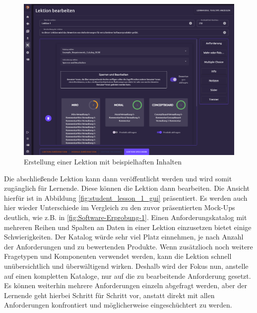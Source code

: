 \begin{figure}[H]
    \centering
    \includegraphics[width=1.0\textwidth]{assets/screenshots/finale_gui/Lektion_Erstellung_mit_Inhalt.png}
    \caption{Erstellung einer Lektion mit beispielhaften Inhalten}
    \label{fig:lesson_create_gui}
\end{figure}

Die abschließende Lektion kann dann veröffentlicht werden und wird somit zugänglich für Lernende. Diese können die Lektion dann bearbeiten. Die Ansicht hierfür ist in Abbildung \ref{fig:student_lesson_1_gui} präsentiert. Es werden auch hier wieder Unterschiede im Vergleich zu den zuvor präsentierten Mock-Ups deutlich, wie z.B. in \ref{fig:Software-Erprobung-1}. Einen Anforderungskatalog mit mehreren Reihen und Spalten an Daten in einer Lektion einzusetzen bietet einige Schwierigkeiten. Der Katalog würde sehr viel Platz einnehmen, je nach Anzahl der Anforderungen und zu bewertenden Produkte. Wenn zusätzlioch noch weitere Fragetypen und Komponenten verwendet werden, kann die Lektion schnell unübersichtlich und überwältigend wirken. Deshalb wird der Fokus nun, anstelle auf einen kompletten Kataloge, nur auf die zu bearbeitende Anforderung gesetzt. Es können weiterhin mehrere Anforderungen einzeln abgefragt werden, aber der Lernende geht hierbei Schritt für Schritt vor, anstatt direkt mit allen Anforderungen konfrontiert und möglicherweise eingeschüchtert zu werden. 

